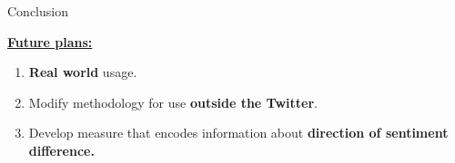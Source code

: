 \documentclass{beamer}
\begin{document}
\begin{frame}[fragile]
\begin{columns}[T]
\begin{column}{.63\textwidth}
\begin{customalertblock}{Conclusion}
\begin{enumerate}
    \end{enumerate}
    \vspace{0.5cm}
    \underline{\textbf{Future plans:}}
    \vspace{1cm}
    \begin{enumerate}
        \item \textbf{Real world} usage.
        \item Modify methodology for use \textbf{outside the Twitter}.
        \item Develop measure that encodes information about \textbf{direction of sentiment difference.}
    \end{enumerate}
\end{customalertblock}
\end{column}
\end{columns}
\end{frame}
\end{document}
